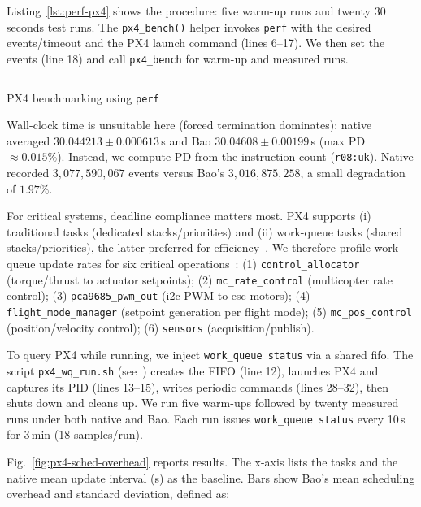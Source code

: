 Listing~\ref{lst:perf-px4} shows the procedure: five warm-up runs and twenty
30 seconds test runs. The \lstinline{px4_bench()} helper invokes \lstinline{perf}
with the desired events/timeout and the PX4 launch command (lines 6--17). We
then set the events (line 18) and call \lstinline{px4_bench} for warm-up and
measured runs.

\begin{longlisting}
\centering
\inputminted[]{bash}{./listing/perfPX4.sh}
\caption{PX4 benchmarking using \texttt{perf}}
\label{lst:perf-px4}
\end{longlisting}

Wall-clock time is unsuitable here (forced termination dominates): native
averaged $30.044213 \pm 0.000613$\,s and Bao $30.04608 \pm 0.00199$\,s (max PD
$\approx 0.015\%$). Instead, we compute PD from the instruction count
(\lstinline{r08:uk}). Native recorded $3{,}077{,}590{,}067$ events versus Bao’s
$3{,}016{,}875{,}258$, a small degradation of $1.97\%$.

For critical systems, deadline compliance matters most. PX4 supports (i)
traditional tasks (dedicated stacks/priorities) and (ii) work-queue tasks
(shared stacks/priorities), the latter preferred for
efficiency~\cite{px4WorkQueue}. We therefore profile work-queue update rates for
six critical
operations~\cite{px4ModulesRefCtrl,px4ModulesRefDriver,px4ModulesRefSystem}:
(1) \lstinline{control_allocator} (torque/thrust to actuator setpoints);
(2) \lstinline{mc_rate_control} (multicopter rate control);
(3) \lstinline{pca9685_pwm_out} (\gls{i2c} PWM to \gls{esc} motors);
(4) \lstinline{flight_mode_manager} (setpoint generation per flight mode);
(5) \lstinline{mc_pos_control} (position/velocity control);
(6) \lstinline{sensors} (acquisition/publish).

To query PX4 while running, we inject \lstinline{work_queue status} via a shared
\gls{fifo}. The script \lstinline{px4_wq_run.sh} (see~\cite{thesis-sw-github})
creates the FIFO (line 12), launches PX4 and captures its PID (lines 13--15),
writes periodic commands (lines 28--32), then shuts down and cleans up. We run
five warm-ups followed by twenty measured runs under both native and Bao. Each
run issues \lstinline{work_queue status} every 10\,s for 3\,min (18
samples/run).

Fig.~\ref{fig:px4-sched-overhead} reports results. The x-axis lists the tasks
and the native mean update interval (\textmu s) as the baseline. Bars show Bao’s
mean scheduling overhead and standard deviation, defined as:

